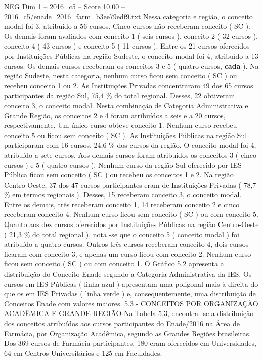 \begin{textsample}{NEG Dim 1 – 2016\_c5 – Score 10.00 – 2016\_c5/enade\_2016\_farm\_b3ee79edf9.txt}
Nessa categoria e região, o conceito modal foi 3, atribuído a 56 cursos.
Cinco cursos não receberam conceito ( SC ).
Os demais foram avaliados com conceito 1 ( seis cursos ), conceito 2 ( 32 cursos ), conceito 4 ( 43 cursos ) e conceito 5 ( 11 cursos ).
Entre os 21 cursos oferecidos por Instituições Públicas na região Sudeste, o conceito modal foi 4, atribuído a 13 cursos.
Os demais cursos receberam os conceitos 3 e 5 ( quatro cursos, \textbf{cada} ).
Na região Sudeste, nesta categoria, nenhum curso ficou sem conceito ( SC ) ou recebeu conceito 1 ou 2.
As Instituições Privadas concentraram 49 dos 65 cursos participantes da região Sul, 75,4 \% do total regional.
Desses, 22 obtiveram conceito 3, o conceito modal.
Nesta combinação de Categoria Administrativa e Grande Região, os conceitos 2 e 4 foram atribuídos a seis e a 20 cursos, respectivamente.
Um único curso obteve conceito 1.
Nenhum curso recebeu conceito 5 ou ficou sem conceito ( SC ).
As Instituições Públicas na região Sul participaram com 16 cursos, 24,6 \% dos cursos da região.
O conceito modal foi 4, atribuído a sete cursos.
Aos demais cursos foram atribuídos os conceitos 3 ( cinco cursos ) e 5 ( quatro cursos ).
Nenhum curso da região Sul oferecido por IES Pública ficou sem conceito ( SC ) ou recebeu os conceitos 1 e 2.
Na região Centro-Oeste, 37 dos 47 cursos participantes eram de Instituições Privadas ( 78,7 \% em termos regionais ).
Desses, 15 receberam conceito 3, o conceito modal.
Entre os demais, três receberam conceito 1, 14 receberam conceito 2 e cinco receberam conceito 4.
Nenhum curso ficou sem conceito ( SC ) ou com conceito 5.
Quanto aos dez cursos oferecidos por Instituições Públicas na região Centro-Oeste ( 21,3 \% do total regional ), nota -se que o conceito 5 ( conceito modal ) foi atribuído a quatro cursos.
Outros três cursos receberam conceito 4, dois cursos ficaram com conceito 3, e apenas um curso ficou com conceito 2.
Nenhum curso ficou sem conceito ( SC ) ou com conceito 1.
O Gráfico 5.2 apresenta a distribuição do Conceito Enade segundo a Categoria Administrativa da IES.
Os cursos em IES Públicas ( linha azul ) apresentam uma poligonal mais à direita do que os em IES Privadas ( linha verde ) e, consequentemente, uma distribuição de Conceitos Enade com valores maiores. 5.3 - CONCEITOS POR ORGANIZAÇÃO ACADÊMICA E GRANDE REGIÃO Na Tabela 5.3, encontra -se a distribuição dos conceitos atribuídos aos cursos participantes do Enade/2016 na Área de Farmácia, por Organização Acadêmica, segundo as Grandes Regiões brasileiras.
Dos 369 cursos de Farmácia participantes, 180 eram oferecidos em Universidades, 64 em Centros Universitários e 125 em Faculdades.

\end{textsample}
